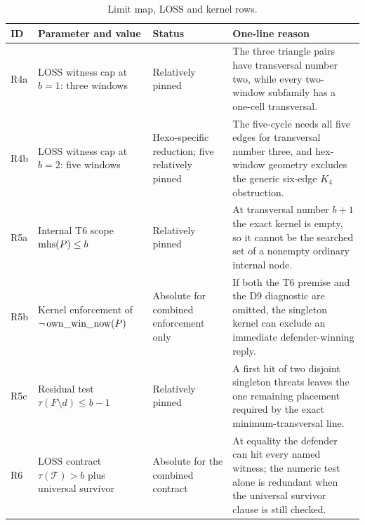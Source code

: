 \begin{table}[p]
  \centering
  \caption{Limit map, LOSS and kernel rows.}
  \label{tab:tightness-loss-kernel}
  \scriptsize
  \renewcommand{\arraystretch}{1.12}
  \begin{tabular}{@{}p{}p{}p{}p{}@{}}
    \toprule
    ID & Parameter and value & Status & One-line reason \\
    \midrule
    R4a & LOSS witness cap at $b=1$: three windows & Relatively pinned &
      The three triangle pairs have transversal number two, while every
      two-window subfamily has a one-cell transversal. \\
    R4b & LOSS witness cap at $b=2$: five windows & Hexo-specific reduction;
      five relatively pinned &
      The five-cycle needs all five edges for transversal number three, and
      hex-window geometry excludes the generic six-edge $K_4$ obstruction. \\
    R5a & Internal T6 scope $\operatorname{mhs}(P)\le b$ & Relatively pinned &
      At transversal number $b+1$ the exact kernel is empty, so it cannot be
      the searched set of a nonempty ordinary internal node. \\
    R5b & Kernel enforcement of $\neg\operatorname{own\_win\_now}(P)$ & Absolute for combined
      enforcement only &
      If both the T6 premise and the D9 diagnostic are omitted, the singleton
      kernel can exclude an immediate defender-winning reply. \\
    R5c & Residual test $\tau(F\setminus d)\le b-1$ & Relatively pinned &
      A first hit of two disjoint singleton threats leaves the one remaining
      placement required by the exact minimum-transversal line. \\
    R6 & LOSS contract $\tau(\mathcal T)>b$ plus universal survivor & Absolute
      for the combined contract &
      At equality the defender can hit every named witness; the numeric test
      alone is redundant when the universal survivor clause is still checked. \\
    \bottomrule
  \end{tabular}
\end{table}

